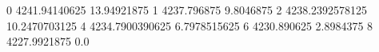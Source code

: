 0 4241.94140625 13.94921875
1 4237.796875 9.8046875
2 4238.2392578125 10.2470703125
4 4234.7900390625 6.7978515625
6 4230.890625 2.8984375
8 4227.9921875 0.0
